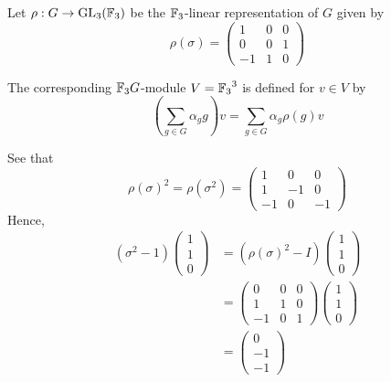 \documentclass{unswmaths}
\begin{document}
\begin{definition}
    Let $\rho:G \rightarrow \operatorname{GL}_3({\mathbb{F}_3})$ be the ${\mathbb{F}_3}$-linear representation
    of $G$ given by 
    \begin{equation*}
        \rho(\sigma) = \begin{pmatrix} 1 & 0 & 0\\ 
            0 & 0 & 1\\
            -1 & 1 & 0
        \end{pmatrix}
    \end{equation*}
    
    The corresponding ${\mathbb{F}_3} G$-module $V = {\mathbb{F}_3}^3$ is defined for $v \in V$ by
    \begin{equation*}
        \left(\sum_{g\in G} \alpha_g g\right)v = \sum_{g\in G}\alpha_g\rho(g)v
    \end{equation*} 
    
    
    See that
    \begin{equation*}
        \rho(\sigma)^2 = \rho(\sigma^2) = \begin{pmatrix}
            1 & 0 & 0\\
            1 & -1 & 0\\
            -1 & 0 & -1
        \end{pmatrix}   
    \end{equation*}
    Hence,
    \begin{align*}
        (\sigma^2-1)\begin{pmatrix} 1\\1\\0\end{pmatrix} &= ( \rho(\sigma)^2-I)\begin{pmatrix} 1\\1\\0\end{pmatrix}\\
        &=\begin{pmatrix}
            0 & 0 & 0\\
            1 & 1 & 0\\
            -1 & 0 & 1
        \end{pmatrix}
        \begin{pmatrix}
            1\\1\\0
        \end{pmatrix}\\
        &=
        \begin{pmatrix}
            0\\-1\\-1
        \end{pmatrix}
    \end{align*}
    
\end{definition}
\end{document}
